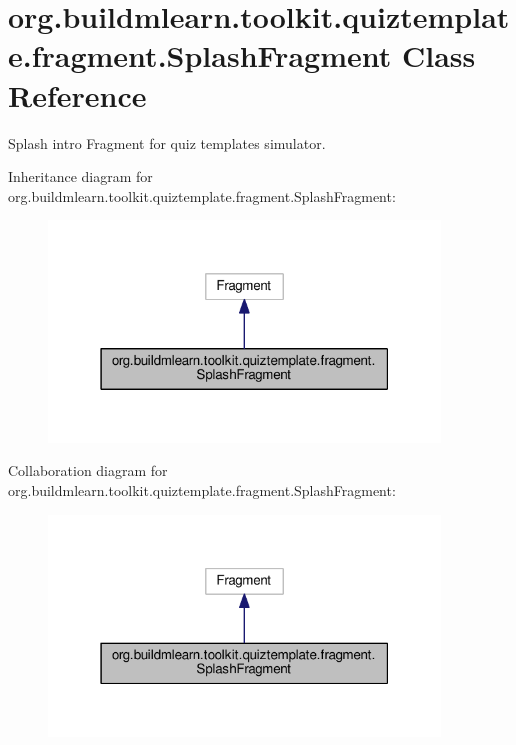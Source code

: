 \hypertarget{classorg_1_1buildmlearn_1_1toolkit_1_1quiztemplate_1_1fragment_1_1SplashFragment}{}\section{org.\+buildmlearn.\+toolkit.\+quiztemplate.\+fragment.\+Splash\+Fragment Class Reference}
\label{classorg_1_1buildmlearn_1_1toolkit_1_1quiztemplate_1_1fragment_1_1SplashFragment}


Splash intro Fragment for quiz template\textquotesingle{}s simulator.  




Inheritance diagram for org.\+buildmlearn.\+toolkit.\+quiztemplate.\+fragment.\+Splash\+Fragment\+:
\nopagebreak
\begin{figure}[H]
\begin{center}
\leavevmode
\includegraphics[width=295pt]{classorg_1_1buildmlearn_1_1toolkit_1_1quiztemplate_1_1fragment_1_1SplashFragment__inherit__graph}
\end{center}
\end{figure}


Collaboration diagram for org.\+buildmlearn.\+toolkit.\+quiztemplate.\+fragment.\+Splash\+Fragment\+:
\nopagebreak
\begin{figure}[H]
\begin{center}
\leavevmode
\includegraphics[width=295pt]{classorg_1_1buildmlearn_1_1toolkit_1_1quiztemplate_1_1fragment_1_1SplashFragment__coll__graph}
\end{center}
\end{figure}
